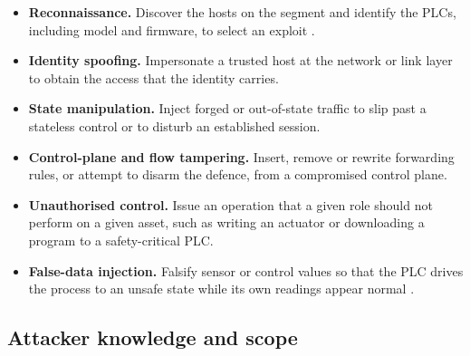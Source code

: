 \begin{itemize}
\item \textbf{Reconnaissance.} Discover the hosts on the segment and identify the PLCs, including model and firmware, to select an exploit \cite{samanis2025phd}.
\item \textbf{Identity spoofing.} Impersonate a trusted host at the network or link layer to obtain the access that the identity carries.
\item \textbf{State manipulation.} Inject forged or out-of-state traffic to slip past a stateless control or to disturb an established session.
\item \textbf{Control-plane and flow tampering.} Insert, remove or rewrite forwarding rules, or attempt to disarm the defence, from a compromised control plane.
\item \textbf{Unauthorised control.} Issue an operation that a given role should not perform on a given asset, such as writing an actuator or downloading a program to a safety-critical PLC.
\item \textbf{False-data injection.} Falsify sensor or control values so that the PLC drives the process to an unsafe state while its own readings appear normal \cite{etxezarreta2026replica}.
\end{itemize}

\subsection{Attacker knowledge and scope}

